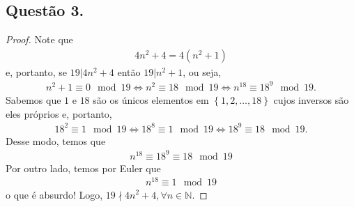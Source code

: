 \documentclass[a4paper,12pt]{article}
\theoremstyle{definition}
\begin{document}
	\subsection*{Questão 3.}
	\begin{proof}
		Note que
		\begin{align*}
		4n^2 + 4 = 4(n^2 + 1)
		\end{align*}
		e, portanto, se $19|4n^2+4$ então $19|n^2 + 1$, ou seja,
		\begin{align*}
		n^2 + 1\equiv 0\mod 19 \Leftrightarrow n^2\equiv 18\mod 19 \Leftrightarrow n^{18}\equiv 18^9\mod 19.
		\end{align*}
		Sabemos que $1$ e $18$ são os únicos elementos em $\left\{ 1,2,\dots,18 \right\}$ cujos inversos são eles próprios e, portanto,
		\begin{align*}
		18^2\equiv 1\mod 19\Leftrightarrow 18^8\equiv 1\mod 19\Leftrightarrow 18^9\equiv 18\mod 19.
		\end{align*}
		Desse modo, temos que
		\begin{align*}
		n^{18}\equiv 18^9\equiv 18\mod 19
		\end{align*}
		Por outro lado, temos por Euler que
		\begin{align*}
		n^{18}\equiv 1\mod 19
		\end{align*}
		o que é absurdo! Logo, $19\nmid 4n^2+4, \forall n\in\mathbb{N}$. 
	\end{proof}
\end{document}
